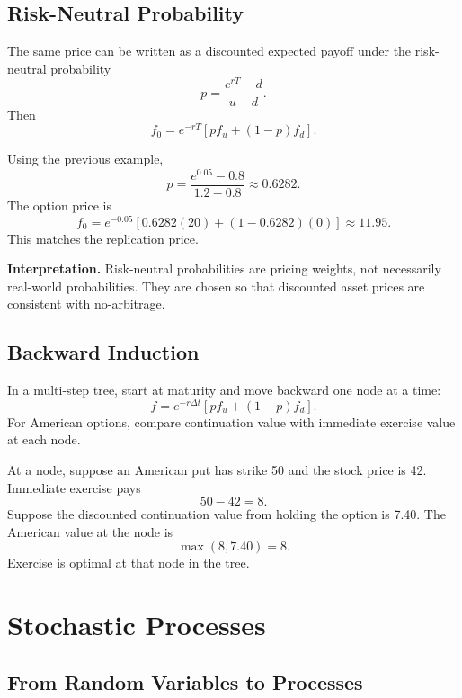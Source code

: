 \subsection{Risk-Neutral Probability}

The same price can be written as a discounted expected payoff under the
risk-neutral probability
\[
    p=\frac{e^{rT}-d}{u-d}.
\]
Then
\[
    f_0=e^{-rT}[pf_u+(1-p)f_d].
\]

\begin{exmp}
Using the previous example,
\[
    p=\frac{e^{0.05}-0.8}{1.2-0.8}\approx 0.6282.
\]
The option price is
\[
    f_0=e^{-0.05}[0.6282(20)+(1-0.6282)(0)]
    \approx 11.95.
\]
This matches the replication price.
\end{exmp}

\begin{boxD}
\textbf{Interpretation.} Risk-neutral probabilities are pricing weights, not
necessarily real-world probabilities. They are chosen so that discounted asset
prices are consistent with no-arbitrage.
\end{boxD}

\subsection{Backward Induction}

In a multi-step tree, start at maturity and move backward one node at a time:
\[
    f=e^{-r\Delta t}[pf_u+(1-p)f_d].
\]
For American options, compare continuation value with immediate exercise value
at each node.

\begin{exmp}
At a node, suppose an American put has strike 50 and the stock price is 42.
Immediate exercise pays
\[
    50-42=8.
\]
Suppose the discounted continuation value from holding the option is 7.40. The
American value at the node is
\[
    \max(8,7.40)=8.
\]
Exercise is optimal at that node in the tree.
\end{exmp}

\section{Stochastic Processes}

\subsection{From Random Variables to Processes}

